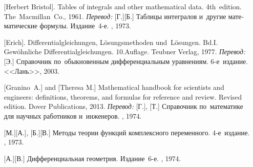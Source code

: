 \begin{thebibliography}{123}
\begin{otherlanguage}{russian}
[Herbert Bristol]. Tables of integrals and other mathematical data. 4th~edition. The~Macmillan~Co., 1961. 
\emph{Перевод:} [Г.][Б.] Таблицы интегралов и~другие математические формулы. Издание~4\hbox{-}е. \naukapublisher, 1973. 

[Erich]. Differentialgleichungen, Lösungsmethoden und~Lö\-sun\-gen. Bd.\:I. Gewöhnliche Differentialgleichungen. 10.\:Auflage. Teubner Verlag, 1977. 
\emph{Перевод:} [Э.] Справочник по~обыкновенным дифференциальным уравнениям. 6\hbox{-}е~издание. <<Лань>>, 2003. 

[Granino~A.] and [Theresa M.]
Mathematical handbook for scientists and engineers: definitions, theorems, and formulas for reference and review.
Revised edition. Dover Publications, 2013. 
\emph{Перевод:}
[Г.],
[Т.]
Справочник по~математике для научных работников и~инженеров.
\naukapublisher,
1974.

[М.][А.],
[Б.][В.]
Методы теории функций комплексного переменного.
4\hbox{-}е~издание.
\naukapublisher,
1973.

[А.][В.]
Дифференциальная геометрия.
Издание~6\hbox{-}е.
\naukapublisher,
1974.

\end{otherlanguage}

\normalsize
\end{thebibliography}

